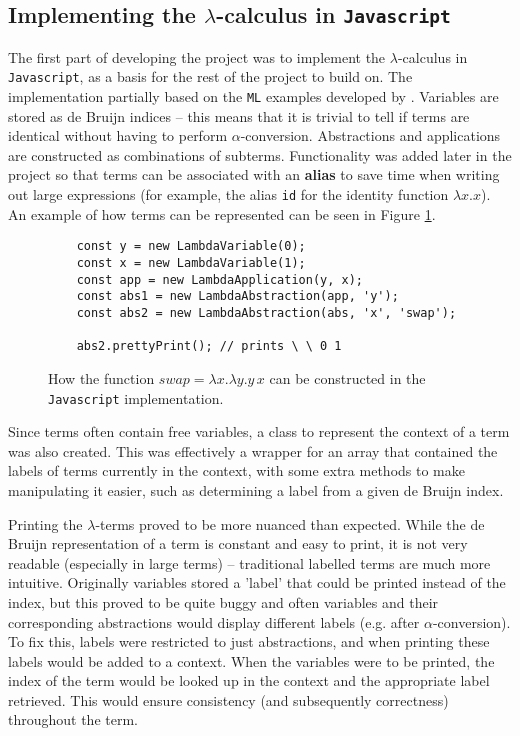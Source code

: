 \documentclass[11pt]{article}
\begin{document}
\subsection{Implementing the \texorpdfstring{$\lambda$}{lambda}-calculus in \texttt{Javascript}}
The first part of developing the project was to implement the $\lambda$-calculus in \texttt{Javascript}, as a basis for the rest of the project to build on. The implementation partially based on the \texttt{ML} examples developed by \cite{pierce}. Variables are stored as de Bruijn indices -- this means that it is trivial to tell if terms are identical without having to perform $\alpha$-conversion. Abstractions and applications are constructed as combinations of subterms. Functionality was added later in the project so that terms can be associated with an \textbf{alias} to save time when writing out large expressions (for example, the alias \texttt{id} for the identity function $\lambda x. x$). An example of how terms can be represented can be seen in Figure \ref{fig:implementation}.

\begin{figure}
    \begin{verbatim}
    const y = new LambdaVariable(0);     
    const x = new LambdaVariable(1);      
    const app = new LambdaApplication(y, x);  
    const abs1 = new LambdaAbstraction(app, 'y');    
    const abs2 = new LambdaAbstraction(abs, 'x', 'swap'); 
    
    abs2.prettyPrint(); // prints \ \ 0 1
    \end{verbatim}
    \caption{How the function $swap = \lambda x. \lambda y. y \, x$ can be constructed in the \texttt{Javascript} implementation.}
    \label{fig:implementation}
\end{figure}

Since terms often contain free variables, a class to represent the context of a term was also created. This was effectively a wrapper for an array that contained the labels of terms currently in the context, with some extra methods to make manipulating it easier, such as determining a label from a given de Bruijn index. 

Printing the $\lambda$-terms proved to be more nuanced than expected. While the de Bruijn representation of a term is constant and easy to print, it is not very readable (especially in large terms) -- traditional labelled terms are much more intuitive. Originally variables stored a 'label' that could be printed instead of the index, but this proved to be quite buggy and often variables and their corresponding abstractions would display different labels (e.g. after $\alpha$-conversion). To fix this, labels were restricted to just abstractions, and when printing these labels would be added to a context. When the variables were to be printed, the index of the term would be looked up in the context and the appropriate label retrieved. This would ensure consistency (and subsequently correctness) throughout the term. 
\end{document}
